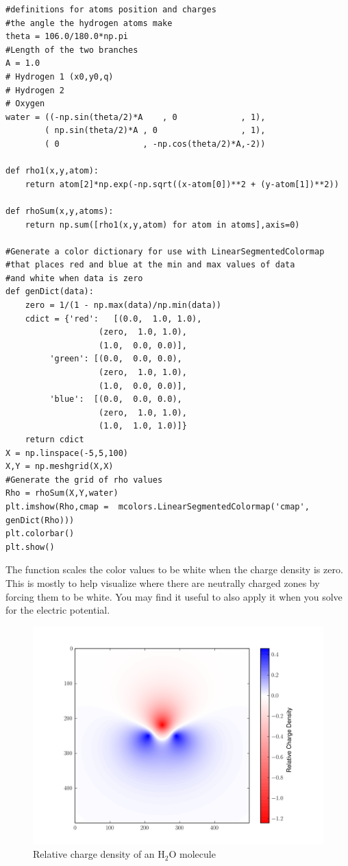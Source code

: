 \begin{lstlisting}
#definitions for atoms position and charges
#the angle the hydrogen atoms make
theta = 106.0/180.0*np.pi
#Length of the two branches
A = 1.0
# Hydrogen 1 (x0,y0,q)
# Hydrogen 2 
# Oxygen
water = ((-np.sin(theta/2)*A	, 0				, 1),
        ( np.sin(theta/2)*A	, 0				 	, 1),
        ( 0					, -np.cos(theta/2)*A,-2))

def rho1(x,y,atom):
    return atom[2]*np.exp(-np.sqrt((x-atom[0])**2 + (y-atom[1])**2))

def rhoSum(x,y,atoms):
    return np.sum([rho1(x,y,atom) for atom in atoms],axis=0)

#Generate a color dictionary for use with LinearSegmentedColormap
#that places red and blue at the min and max values of data
#and white when data is zero
def genDict(data):
    zero = 1/(1 - np.max(data)/np.min(data))
    cdict = {'red':   [(0.0,  1.0, 1.0),
                   (zero,  1.0, 1.0),
                   (1.0,  0.0, 0.0)],
         'green': [(0.0,  0.0, 0.0),
                   (zero,  1.0, 1.0),
                   (1.0,  0.0, 0.0)],
         'blue':  [(0.0,  0.0, 0.0),
                   (zero,  1.0, 1.0),
                   (1.0,  1.0, 1.0)]}
    return cdict
X = np.linspace(-5,5,100)
X,Y = np.meshgrid(X,X)
#Generate the grid of rho values
Rho = rhoSum(X,Y,water)
plt.imshow(Rho,cmap =  mcolors.LinearSegmentedColormap('cmap', genDict(Rho)))
plt.colorbar()
plt.show()
\end{lstlisting}
The function  scales the color values to be white when the charge density is zero. This is mostly to help visualize where there are neutrally charged zones by forcing them to be white. You may find it useful to also apply it when you solve for the electric potential.

\begin{figure}[ht]
\centering
\includegraphics[width=12cm]{waterRho.png}
\caption{Relative charge density of an H$_2$O molecule}
\label{figure3}
\end{figure}

